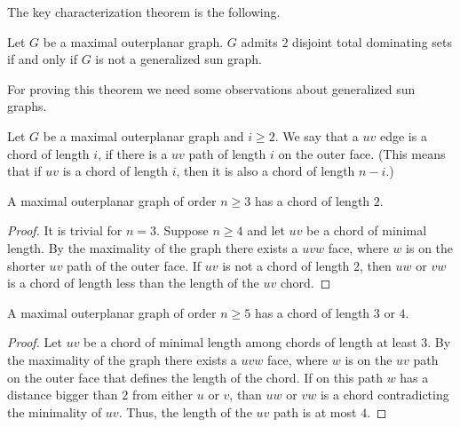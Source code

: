 The key characterization theorem is the following.

\begin{thm}\label{thm:outerplanar}
  Let $G$ be a maximal outerplanar graph. $G$ admits $2$ disjoint total dominating
  sets if and only if $G$ is not a generalized sun graph.
\end{thm}

For proving this theorem we need some observations about generalized sun graphs.

\begin{definition}
  Let $G$ be a maximal outerplanar graph and $i \ge 2$. We say that a $uv$ edge is a chord
  of length $i$, if there is a $uv$ path of length $i$ on the outer face. (This means
  that if $uv$ is a chord of length $i$, then it is also a chord of length $n - i$.)
\end{definition}

\begin{lemma} \label{lem:two_chord}
  A maximal outerplanar graph of order $n \ge 3$ has a chord of length $2$.
\end{lemma}
\begin{proof}
  It is trivial for $n = 3$. Suppose $n \ge 4$ and
  let $uv$ be a chord of minimal length. By
  the maximality of the graph there exists a $uvw$ face, where $w$ is on the shorter
  $uv$ path of the outer face. If $uv$ is not a chord of length $2$, then $uw$ or $vw$
  is a chord of length less than the length of the $uv$ chord.
\end{proof}

\begin{lemma} \label{lem:3-4_chord}
  A maximal outerplanar graph of order $n \ge 5$ has a chord of length $3$ or $4$.
\end{lemma}
\begin{proof}
  Let $uv$ be a chord of minimal length among chords of length at least $3$. By
  the maximality of the graph there exists a $uvw$ face, where $w$ is on the $uv$ path
  on the outer face that defines the length of the chord. If on this path $w$ has a distance
  bigger than $2$ from either $u$ or $v$, than $uw$ or $vw$ is a chord contradicting
  the minimality of $uv$. Thus, the length of the $uv$ path is at most $4$.
\end{proof}

